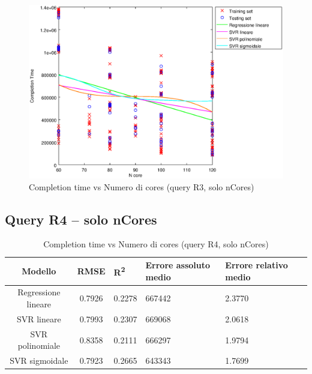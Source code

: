 \documentclass[a4paper,11pt]{article}
\begin{document}
\begin {figure}[hbtp]
\centering
\includegraphics[width=\textwidth]{output/R3_SOLO_CORE/plot_R3_-.eps}
\caption {Completion time vs Numero di cores (query R3, solo nCores)}
\end {figure}

\newpage
\subsection{Query R4 -- solo nCores}
\begin{table}[bhpt]
	\centering
	\begin{adjustbox}{center}
		\begin{tabular}{c | c M{1.2cm} M{2.5cm} M{2.5cm} M{1.8cm}}
			Modello & RMSE & R\textsuperscript{2} & Errore assoluto medio & Errore relativo medio \tabularnewline
			\hline
			Regressione lineare & 0.7926 & 0.2278 & 667442 & 2.3770 \\
			SVR lineare & 0.7993 & 0.2307 & 669068 & 2.0618 \\
			SVR polinomiale & 0.8358 & 0.2111 & 666297 & 1.9794 \\
			SVR sigmoidale & 0.7923 & 0.2665 & 643343 & 1.7699 \\
		\end{tabular}
	\end{adjustbox}
	\\
	\caption{Completion time vs Numero di cores (query R4, solo nCores)}
	\label{table_R4_nCores}
\end{table}
\end{document}
